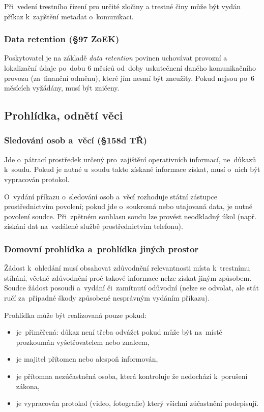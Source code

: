 Při~vedení trestního řízení pro určité zločiny a trestné činy může být vydán příkaz k~zajištění metadat o~komunikaci.

\subsubsection{Data retention (§97 ZoEK)}

Poskytovatel je na základě \emph{data retention} povinen uchovávat provozní a lokalizační údaje po~dobu 6 měsíců od~doby uskutečnení daného komunikačního provozu (za~finanční odměnu), které jím nesmí být zneužity.
Pokud nejsou po~6 měsících vyžádány, musí být zničeny.


\subsection{Prohlídka, odnětí věci}

\subsubsection{Sledování osob a~věcí (§158d TŘ)}

Jde o~pátrací prostředek určený pro~zajištění operativních informací, ne~důkazů k~soudu.
Pokud je nutné u~soudu takto získané informace získat, musí o~nich být vypracován protokol.

O~vydání příkazu o~sledování osob a~věcí rozhoduje státní zástupce prostřednictvím povolení; pokud jde o~soukromá nebo utajovaná data, je nutné povolení soudce.
Při~zpětném souhlasu soudu lze provést neodkladný úkol (např. získání dat na~vzdálené službě prostřednictvím telefonu).

\subsubsection{Domovní prohlídka a~prohlídka jiných prostor}

Žádost k~ohledání musí obsahovat zdůvodnění relevantnosti místa k~trestnímu stíhání, včetně zdůvodnění proč takové informace nelze získat jiným způsobem.
Soudce žádost posoudí a~vydání či~zamítnutí odůvodní (nelze se odvolat, ale stát ručí za~případné škody způsobené nesprávným vydáním příkazu).

Prohlídka může být realizovaná pouze pokud:
\vspace*{-1em}\begin{itemize}
\item je~přiměřená: důkaz není třeba odvážet pokud může být na~místě prozkoumán vyšetřovatelem nebo znalcem,
\item je majitel přítomen nebo alespoň informován,
\item je přítomna nezúčastněná osoba, která kontroluje že nedochází k~porušení zákona,
\item je vypracován protokol (video, fotografie) který všichni zúčastnění podepisují.
\end{itemize}

